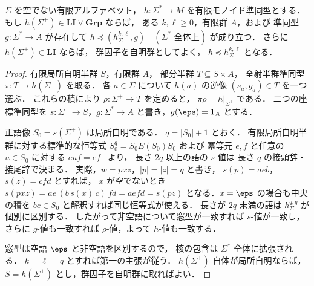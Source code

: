 \begin{lemma}
\label{lem:mcfg-li-group-window}
$\Sigma$ を空でない有限アルファベット，
$h:\Sigma^*\to M$ を有限モノイド準同型とする．
もし $h(\Sigma^+)\in\mathbf{LI}\vee\mathbf{Grp}$ ならば，
ある $k,\ell\ge0$，有限群 $A$，および
準同型 $g:\Sigma^*\to A$ が存在して
\(h\preceq(h_\Sigma^{k,\ell},g)
 \quad(\Sigma^*\text{ 全体上})\)
が成り立つ．
さらに $h(\Sigma^+)\in\mathbf{LI}$ ならば，
群因子を自明群としてよく，
$h\preceq h_\Sigma^{k,\ell}$ となる．
\end{lemma}
\begin{proof}
有限局所自明半群 $S$，有限群 $A$，
部分半群 $T\subseteq S\times A$，
全射半群準同型 $\pi:T\to h(\Sigma^+)$ を取る．
各 $a\in\Sigma$ について $h(a)$ の逆像
$(s_a,g_a)\in T$ を一つ選ぶ．
これらの積により $\rho:\Sigma^+\to T$ を定めると，
$\pi\rho=h|_{\Sigma^+}$ である．
二つの座標準同型を
$s:\Sigma^+\to S$，$g:\Sigma^*\to A$
と書き，$g(\eps)=1_A$ とする．

正語像 $S_0=s(\Sigma^+)$ は局所自明である．
$q=|S_0|+1$ とおく．
有限局所自明半群に対する標準的な恒等式
$S_0^q=S_0E(S_0)S_0$ および
冪等元 $e,f$ と任意の $u\in S_0$ に対する
$euf=ef$~\cite{Pin1986,kuriyamaCFG} より，
長さ $2q$ 以上の語の $s$-値は
長さ $q$ の接頭辞・接尾辞で決まる．
実際，$w=pxz$，$|p|=|z|=q$ と書き，
$s(p)=aeb$，$s(z)=cfd$ とすれば，
$x$ が空でないとき
\(s(pxz)=ae\,(b\,s(x)\,c)\,fd
       =aefd=s(pz)\)
となる．$x=\eps$ の場合も中央の積を
$bc\in S_0$ と解釈すれば同じ恒等式が使える．
長さが $2q$ 未満の語は
$h_\Sigma^{q,q}$ が個別に区別する．
したがって非空語について窓型が一致すれば
$s$-値が一致し，さらに $g$-値も一致すれば
$\rho$-値，よって $h$-値も一致する．

窓型は空語 $\eps$ と非空語を区別するので，
核の包含は $\Sigma^*$ 全体に拡張される．
$k=\ell=q$ とすれば第一の主張が従う．
$h(\Sigma^+)$ 自体が局所自明ならば，
$S=h(\Sigma^+)$ とし，群因子を自明群に取ればよい．
\end{proof}

